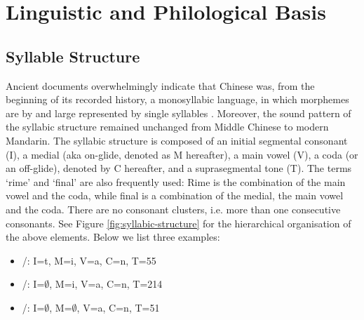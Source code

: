 \section{Linguistic and Philological Basis} \label{ling-philo-basis}

\subsection{Syllable Structure} \label{sec:syllable-structure}

Ancient documents overwhelmingly indicate that Chinese was, from the beginning of its recorded history, a monosyllabic language,
 in which morphemes are by and large represented by single syllables \citep{norman1988,shen_2020}.
Moreover, the sound pattern of the syllabic structure remained unchanged from Middle Chinese to modern Mandarin.
The syllabic structure is composed of an initial segmental consonant (I), 
a medial (aka on-glide, denoted as M hereafter), a main vowel (V), a coda (or an off-glide), denoted by C hereafter, and a suprasegmental tone (T).
The terms `rime' and `final' are also frequently used: 
Rime is the combination of the main vowel and the coda, while final is a combination of the medial, the main vowel and the coda.
There are no consonant clusters, i.e. more than one consecutive consonants.
See Figure \ref{fig:syllabic-structure} for the hierarchical organisation of the above elements. 
Below we list three examples:
\begin{itemize} \setlength\itemsep{0.01em}
  \item {}/\text{[tian]}: I=t, M=i, V=a, C=n, T=55 
  \item {}/\text{[ian]}: I=$\emptyset$, M=i, V=a, C=n, T=214
  \item {}/\text{[an]}: I=$\emptyset$, M=$\emptyset$, V=a, C=n, T=51
\end{itemize}

